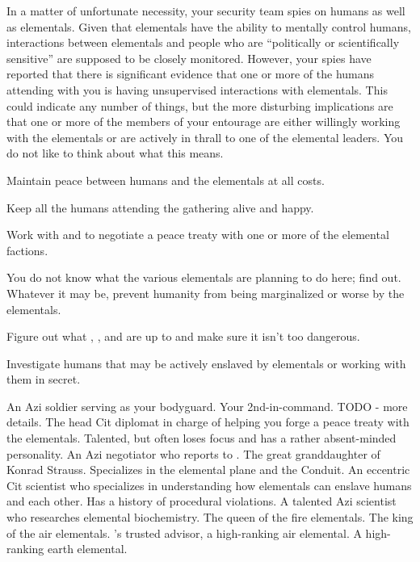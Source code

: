 \documentclass[char]{elementals}
\begin{document}
In a matter of unfortunate necessity, your security team spies on humans as well as elementals. Given that elementals have the ability to mentally control humans, interactions between elementals and people who are ``politically or scientifically sensitive'' are supposed to be closely monitored. However, your spies have reported that there is significant evidence that one or more of the humans attending with you is having unsupervised interactions with elementals. This could indicate any number of things, but the more disturbing implications are that one or more of the members of your entourage are either willingly working with the elementals or are actively in thrall to one of the elemental leaders. You do not like to think about what this means.



\begin{itemz}[Goals]
  \item Maintain peace between humans and the elementals at all costs.
  \item Keep all the humans attending the gathering alive and happy.
  \item Work with \cAvatar{} and \cDiplomat{} to negotiate a peace treaty with one or more of the elemental factions.
  \item You do not know what the various elementals are planning to do here; find out. Whatever it may be, prevent humanity from being marginalized or worse by the elementals.
  \item Figure out what \cGD{}, \cMS{}, and \cScientist{} are up to and make sure it isn't too dangerous.
  \item Investigate humans that may be actively enslaved by elementals or working with them in secret.
\end{itemz}

\begin{contacts}
  \contact{\cRomeo{}} An Azi soldier serving as your bodyguard.
  \contact{\cDema{}} Your 2nd-in-command. TODO - more details.
	\contact{\cAvatar{}} The head Cit diplomat in charge of helping you forge a peace treaty with the elementals. Talented, but often loses focus and has a rather absent-minded personality.
	\contact{\cDiplomat{}} An Azi negotiator who reports to \cAvatar{}.
	\contact{\cGD{}} The great granddaughter of Konrad Strauss. Specializes in the elemental plane and the Conduit.
	\contact{\cMS{}} An eccentric Cit scientist who specializes in understanding how elementals can enslave humans and each other. Has a history of procedural violations.
	\contact{\cScientist{}} A talented Azi scientist who researches elemental biochemistry.
	\contact{\cQueen{}} The queen of the fire elementals.
	\contact{\cKing{}} The king of the air elementals.
	\contact{\cNaturalist{}} \cKing{}'s trusted advisor, a high-ranking air elemental.
	\contact{\cLoyal{}} A high-ranking earth elemental.
\end{contacts}
\end{document}
